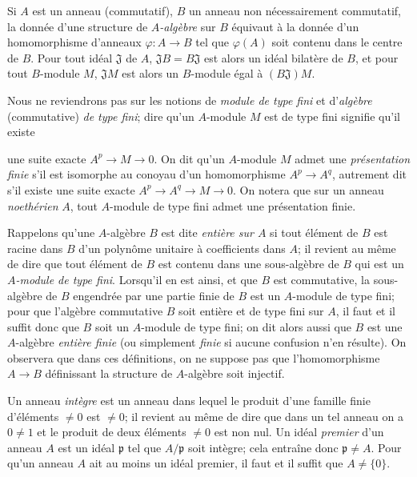 \begin{env}[1.0.4]
\label{0.1.0.4-fr}
Si $A$ est un anneau (commutatif), $B$ un anneau non nécessairement commutatif, la donnée d'une structure de \emph{$A$-algèbre} sur $B$ équivaut à la donnée d'un homomorphisme d'anneaux $\varphi:A\to B$ tel que $\varphi(A)$ soit contenu dans le centre de $B$.
Pour tout idéal $\mathfrak{J}$ de $A$, $\mathfrak{J}B=B\mathfrak{J}$ est alors un idéal bilatère de $B$, et pour tout $B$-module $M$, $\mathfrak{J}M$ est alors un $B$-module égal à $(B\mathfrak{J})M$.
\end{env}

\begin{env}[1.0.5]
\label{0.1.0.5-fr}
Nous ne reviendrons pas sur les notions de \emph{module de type fini} et d'\emph{algèbre} (commutative) \emph{de type fini}; dire qu'un $A$-module $M$ est de type fini signifie qu'il existe

une suite exacte $A^p\to M\to 0$.
On dit qu'un $A$-module $M$ admet une \emph{présentation finie} s'il est isomorphe au conoyau d'un homomorphisme $A^p\to A^q$, autrement dit s'il existe une suite exacte $A^p\to A^q\to M\to 0$.
On notera que sur un anneau \emph{noethérien} $A$, tout $A$-module de type fini admet une présentation finie.

Rappelons qu'une $A$-algèbre $B$ est dite \emph{entière sur $A$} si tout élément de $B$ est racine dans $B$ d'un polynôme unitaire à coefficients dans $A$; il revient au même de dire que tout élément de $B$ est contenu dans une sous-algèbre de $B$ qui est un \emph{$A$-module de type fini}.
Lorsqu'il en est ainsi, et que $B$ est commutative, la sous-algèbre de $B$ engendrée par une partie finie de $B$ est un $A$-module de type fini; pour que l'algèbre commutative $B$ soit entière et de type fini sur $A$, il faut et il suffit donc que $B$ soit un $A$-module de type fini; on dit alors aussi que $B$ est une $A$-algèbre \emph{entière finie} (ou simplement \emph{finie} si aucune confusion n'en résulte).
On observera que dans ces définitions, on ne suppose pas que l'homomorphisme $A\to B$ définissant la structure de $A$-algèbre soit injectif.
\end{env}

\begin{env}[1.0.6]
\label{0.1.0.6-fr}
Un anneau \emph{intègre} est un anneau dans lequel le produit d'une famille finie d'éléments $\neq 0$ est $\neq 0$; il revient au même de dire que dans un tel anneau on a $0\neq 1$ et le produit de deux éléments $\neq 0$ est non nul.
Un idéal \emph{premier} d'un anneau $A$ est un idéal $\mathfrak{p}$ tel que $A/\mathfrak{p}$ soit intègre; cela entraîne donc $\mathfrak{p}\neq A$.
Pour qu'un anneau $A$ ait au moins un idéal premier, il faut et il suffit que $A\neq\{0\}$.
\end{env}

